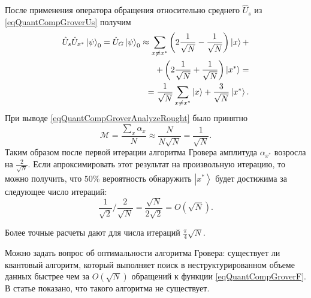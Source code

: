 После применения оператора обращения относительно среднего $\hat{U}_s$ 
из \eqref{eqQuantCompGroverUs} получим
\begin{eqnarray}
\hat{U}_s \hat{U}_{x^{\ast}} \left|\psi\right>_0 = 
\hat{U}_G \left|\psi\right>_0 \approx 
\sum_{x\ne x^{\ast}} \left( 2 \frac{1}{\sqrt{N}} - \frac{1}{\sqrt{N}}
\right) \ket{x} + 
\nonumber \\
+ \left( 2 \frac{1}{\sqrt{N}} +
\frac{1}{\sqrt{N}} \right) \left|x^{\ast}\right> = 
\nonumber \\
= 
\frac{1}{\sqrt{N}}\sum_{x\ne x^{\ast}} \ket{x} + 
\frac{3}{\sqrt{N}} \left|x^{\ast}\right>.
\label{eqQuantCompGroverAnalyzeRought}
\end{eqnarray}
При выводе \eqref{eqQuantCompGroverAnalyzeRought} было принятно 
\[
\mathcal{M} = \frac{\sum_x \alpha_x}{N} \approx
\frac{N}{N \sqrt{N}} = \frac{1}{\sqrt{N}}.
\]
Таким образом после первой итерации алгоритма Гровера амплитуда
$\alpha_{x^{\ast}}$ возросла на $\frac{2}{\sqrt{N}}$. Если
апроксимировать этот результат на произвольную итерацию, то можно
получить, что $50\%$ вероятность обнаружить $\left|x^{\ast}\right>$
будет достижима за следующее число итераций:
\[
\frac{1}{\sqrt{2}}/\frac{2}{\sqrt{N}} =
\frac{\sqrt{N}}{2 \sqrt{2}} = O\left(\sqrt{N}\right).
\]

Более точные расчеты \cite{nielsen2000quantum} дают для числа итераций
$\frac{\pi}{4}\sqrt{N}$. 

Можно задать вопрос об оптимальности алгоритма Гровера: существует ли
квантовый алгоритм, который выполняет поиск в неструктурированном
объеме данных быстрее чем за $O\left(\sqrt{N}\right)$ обращений к
функции \eqref{eqQuantCompGroverF}. В статье
\cite{bBennettGroverOptimal} показано, что такого алгоритма
не существует.
